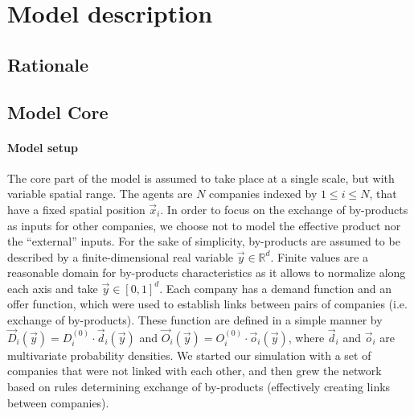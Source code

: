 \documentclass[fleqn,10pt]{wlscirep}
\begin{document}





\section*{Model description} \label{sec:modelDescription} %


\subsection*{Rationale}




\subsection*{Model Core}


\paragraph*{Model setup}

The core part of the model is assumed to take place at a single scale, but with variable spatial range. The agents are $N$ companies indexed by $1\leq i\leq N$, that have a fixed spatial position $\vec{x}_i$. In order to focus on the exchange of by-products as inputs for other companies, we choose not to model the effective product nor the ``external'' inputs. For the sake of simplicity, by-products are assumed to be described by a finite-dimensional real variable $\vec{y}\in \mathbb{R}^d$. Finite values are a reasonable domain for by-products characteristics as it allows to normalize along each axis and take $\vec{y} \in \left[0,1\right]^d$. Each company has a demand function and an offer function, which were used to establish links between pairs of companies (i.e. exchange of by-products). These function are defined in a simple manner by $\vec{D}_i (\vec{y})= D_i^{(0)}\cdot \vec{d}_i (\vec{y})$ and $\vec{O}_i (\vec{y})= O_i^{(0)}\cdot \vec{o}_i (\vec{y})$, where $\vec{d}_i$ and $\vec{o}_i$ are multivariate probability densities. We started our simulation with a set of companies that were not linked with each other, and then grew the network based on rules determining exchange of by-products (effectively creating links between companies).
\end{document}
